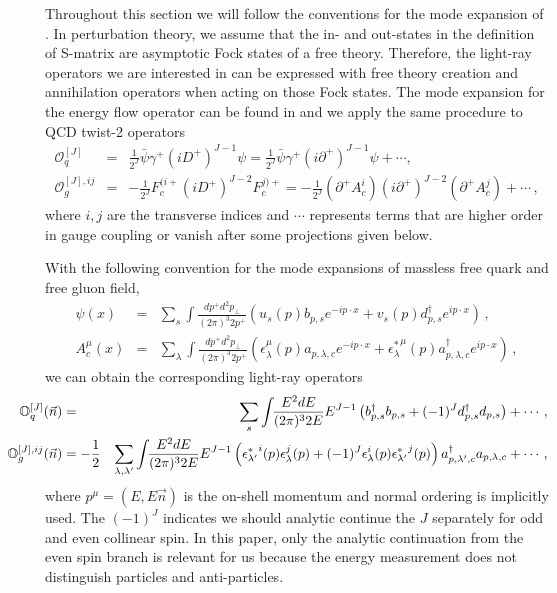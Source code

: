 \documentclass[letterpaper,11pt]{article}
\def\bea{\begin{eqnarray}}
\def\eea{\end{eqnarray}}
\begin{document}
Throughout this section we will follow the conventions for the mode expansion of \cite{Belitsky:2013xxa,Belitsky:2013bja}. In perturbation theory, we assume that the in- and out-states in the definition of S-matrix are asymptotic Fock states of a free theory. Therefore, the light-ray operators we are interested in can be expressed with free theory creation and annihilation operators when acting on those Fock states. The mode expansion for the energy flow operator can be found in \cite{Belitsky:2013xxa,Belitsky:2013bja} and we apply the same procedure to QCD twist-2 operators
\bea
\mathcal{O}_q^{[J]}&=&\frac{1}{2^J}\bar{\psi}\gamma^{+}(iD^+)^{J-1}\psi=\frac{1}{2^J} \bar{\psi}\gamma^+ (i\partial^+)^{J-1}\psi+\cdots,\\
\mathcal{O}_{g}^{[J], ij}&=&-\frac{1}{2^J} F_{c}^{(i +}(iD^+)^{J-2}F_{c}^{j) +}=-\frac{1}{2^J} \left(\partial^+ A^{i}_{c}\right)(i\partial^+)^{J-2}\left(\partial^+ A_c^{j} \right)+\cdots\,,
\eea
where $i,j$ are the transverse indices and $\cdots$ represents terms that are higher order in gauge coupling or vanish after some projections given below.


With the following convention for the mode expansions of massless free quark and free gluon field,
\bea
\psi(x)&=&\sum_s \int\frac{dp^+ d^2p_{\perp}}{(2\pi)^3 2p^+} \left(u_s(p) b_{p,s} e^{-i p\cdot x} + v_s(p) d^{\dagger}_{p,s} e^{i p\cdot x}\right)\,,\\
A^{\mu}_{c}(x)&=&\sum_{\lambda} \int\frac{dp^+ d^2p_{\perp}}{(2\pi)^3 2p^+}\left(\epsilon^{\mu}_{\lambda}(p) a_{p,\lambda,c} e^{-ip\cdot x} +{\epsilon^{*}_{\lambda}}^{\mu}(p) a^{\dagger}_{p,\lambda,c} e^{ip\cdot x} \right)\,,
\eea
we can obtain the corresponding light-ray operators
\bea
\hspace{-1cm}\mathbb{O}_q^{[J]}(\vec{n})&=&\sum_{s}\int\!\! \frac{E^2 dE}{(2\pi)^3 2E}  E^{J-1} \left(b_{p, s}^{\dagger}b_{p,s}+(-1)^J d_{p,s}^{\dagger} d_{p,s} \right)+\cdots\,, \label{eq: unpolarized_quark}\\
\hspace{-1cm}\mathbb{O}_g^{[J],ij}(\vec{n})&=-\frac{1}{2}&\sum_{\lambda,\lambda^\prime} \int\!\! \frac{E^2 dE}{(2\pi)^3 2E}  E^{J-1} \left( {\epsilon^{*}_{\lambda^\prime}}^{i}(p) \epsilon_{\lambda}^{j}(p)  +(-1)^{J} \epsilon_{\lambda}^{i}(p){\epsilon_{\lambda^\prime}^{*}}^{j}(p) \right) a^{\dagger}_{p,\lambda^\prime,c} a_{p,\lambda,c}+\cdots\,,
\eea
where $p^\mu=(E, E\vec{n})$ is the on-shell momentum and normal ordering is implicitly used. The $(-1)^J$ indicates we should analytic continue the $J$ separately for odd and even collinear spin. In this paper, only the analytic continuation from the even spin branch is relevant for us because the  energy measurement does not distinguish particles and anti-particles. 
\end{document}
